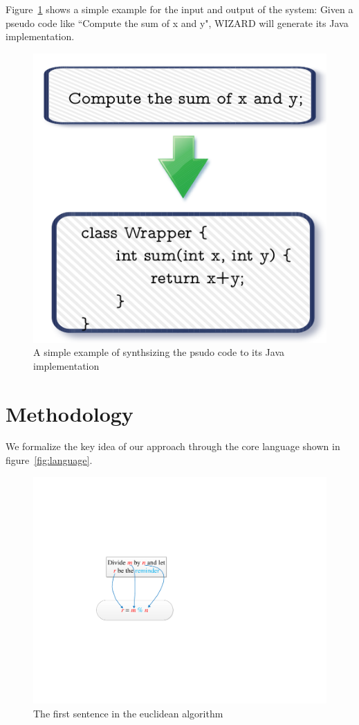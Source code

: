 \documentclass[11pt]{article}
\begin{document}
 Figure~\ref{fig:convert} shows a 
 simple example for the input and output of the system: Given a pseudo code like 
 ``Compute the sum of x and y", WIZARD will generate its Java implementation.

  
\begin{figure}
\centering
\includegraphics[scale=0.3]{convert.png}
\caption{A simple example of synthsizing the psudo code to its Java implementation}\label{fig:convert}
\end{figure}


\section{Methodology}
We formalize the key idea of our approach through the core language shown in
figure~\ref{fig:language}. 
 
 \begin{figure}
\centering
\includegraphics[scale=0.7]{figure2.pdf}
\caption{The first sentence in the euclidean algorithm}\label{fig:align}
\end{figure}
\end{document}
